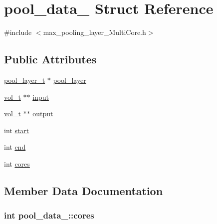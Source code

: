 \hypertarget{structpool__data__}{}\section{pool\+\_\+data\+\_\+ Struct Reference}
\label{structpool__data__}


{\ttfamily \#include $<$max\+\_\+pooling\+\_\+layer\+\_\+\+Multi\+Core.\+h$>$}

\subsection*{Public Attributes}
\begin{DoxyCompactItemize}
\item 
\hyperlink{max__pooling__layer_8h_a5948d5617be08df8a54e4524207e8442}{pool\+\_\+layer\+\_\+t} $\ast$ \hyperlink{structpool__data___a4d5584212e4863686cc77663f6a24590}{pool\+\_\+layer}
\item 
\hyperlink{data__structure_8h_a051bd2b17d42e70d86b4314e0dd8881e}{vol\+\_\+t} $\ast$$\ast$ \hyperlink{structpool__data___aa60f0537a55e5bdb606679aac5126c5d}{input}
\item 
\hyperlink{data__structure_8h_a051bd2b17d42e70d86b4314e0dd8881e}{vol\+\_\+t} $\ast$$\ast$ \hyperlink{structpool__data___ae44c5067647456c8fc44ac3f6842a934}{output}
\item 
int \hyperlink{structpool__data___aec736d302780fa4d45618a638836c9bd}{start}
\item 
int \hyperlink{structpool__data___afc58fb17428e6f919cac467049216187}{end}
\item 
int \hyperlink{structpool__data___a5625bdc56b63b35a49da1c839a228a7b}{cores}
\end{DoxyCompactItemize}


\subsection{Member Data Documentation}
\subsubsection[{cores}]{\setlength{\rightskip}{0pt plus 5cm}int pool\+\_\+data\+\_\+\+::cores}\hypertarget{structpool__data___a5625bdc56b63b35a49da1c839a228a7b}{}\label{structpool__data___a5625bdc56b63b35a49da1c839a228a7b}
